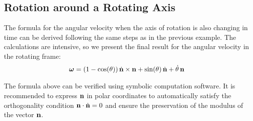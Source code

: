 \documentclass[12pt]{article}
\begin{document}
\subsection{Rotation around a Rotating Axis}

The formula for the angular velocity when the axis of rotation is also changing in time can be
derived following the same steps as in the previous example. The calculations are intensive,
so we present the final result for the angular velocity in the rotating frame:
\begin{equation}
  \boldsymbol{\omega} = (1-\cos(\theta))\,\dot{\vb{n}}\times\vb{n}
    + \sin(\theta)\,\dot{\vb{n}} + \dot\theta\,\vb{n}
  \label{kinematics:moving-axis-angular-velocity}
\end{equation}

The formula above can be verified using symbolic computation software. It is recommended to
express $\vb{n}$ in polar coordinates to automatically satisfy the orthogonality condition
$\vb{n}\cdot\dot{\vb{n}} = 0$ and ensure the preservation of the modulus of the vector
$\vb{n}$.

\end{document}
